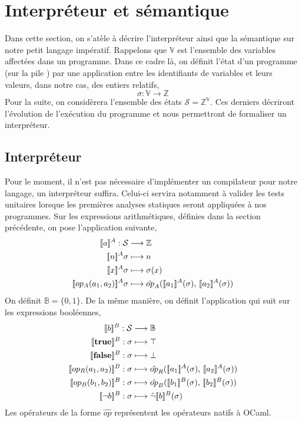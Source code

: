 \documentclass[a4paper, 10pt]{article}
\begin{document}
\section{Interpréteur et sémantique}
Dans cette section, on s'atèle à décrire l'interpréteur ainsi que la sémantique sur notre petit langage impératif. Rappelons que
$\mathbb{V}$ est l'ensemble des variables affectées dans un programme.
Dans ce cadre là, on définit l'état d'un programme (sur la pile ) par une application entre les identifiants de variables et leurs valeurs, 
dans notre cas, des entiers relatifs,
\[\sigma : \mathbb{V} \longrightarrow \mathbb{Z}\]
Pour la suite, on considèrera l'ensemble des états $\mathcal{S} = \mathbb{Z}^\mathbb{V}$.
Ces derniers décriront l'évolution de l'exécution du programme et nous permettront de formaliser un interpréteur.

\subsection{Interpréteur}
Pour le moment, il n'est pas nécessaire d'implémenter un compilateur pour notre langage, un interpréteur suffira.
Celui-ci servira notamment à valider les tests unitaires lorsque les premières analyses statiques seront appliquées
à nos programmes.
Sur les expressions arithmétiques, définies dans la section précédente, on pose l'application suivante,
\begin{align*}
	\intrfun{\arithexp}{A}:\mathcal{S}&\longrightarrow\mathbb{Z}\\
	\intrfun{n}{A}\sigma&\longmapsto n\\
	\intrfun{x}{A}\sigma&\longmapsto\sigma(x)\\
	\intrfun{op_A(a_1, a_2)}{A}\sigma&\longmapsto\hat{op}_A(\intr{a_1}{A}{\sigma}\text{, }\intr{a_2}{A}{\sigma})\\
\end{align*}
On définit $\mathbb{B} = \{0, 1\}$. De la même manière, on définit l'application qui suit sur les expressions booléennes, 
\begin{align*}
	\intrfun{\boolexp}{B}:\mathcal{S}&\longrightarrow\mathbb{B}\\	
	\intrfun{\textbf{true}}{B}:\sigma&\longmapsto\top\\
	\intrfun{\textbf{false}}{B}:\sigma&\longmapsto\bot\\
	\intrfun{op_R(a_1, a_2)}{B}:\sigma &\longmapsto \hat{op}_R(\intr{a_1}{A}{\sigma}\text{, }\intr{a_2}{A}{\sigma})\\
	\intrfun{op_B(b_1, b_2)}{B}:\sigma&\longmapsto \hat{op}_B(\intr{b_1}{B}{\sigma}\text{, }\intr{b_2}{B}{\sigma})\\
	\intrfun{\neg b}{B}:\sigma&\longmapsto\hat{\neg}\intr{b}{B}{\sigma}
\end{align*}
Les opérateurs de la forme $\hat{op}$ représentent les opérateurs natifs à OCaml.
\end{document}
